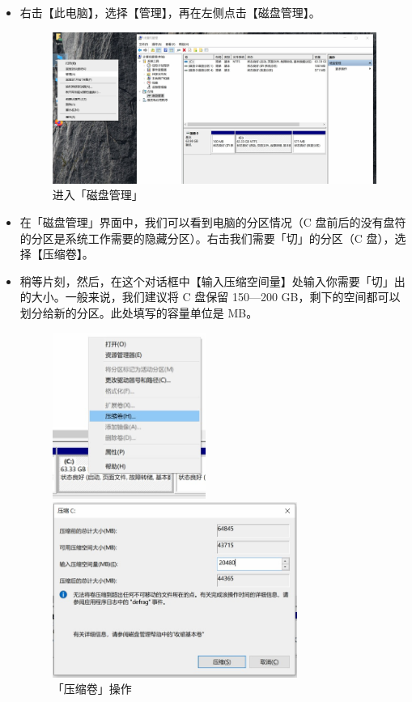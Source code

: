 \begin{itemize}
  \item 右击【此电脑】，选择【管理】，再在左侧点击【磁盘管理】。
    \begin{figure}[htb!]
      \centering
      \includegraphics[width=11cm]{assets/Disk_Manage.jpg}
      \caption{进入「磁盘管理」}
      \label{disk-manage}
    \end{figure}
  \item 在「磁盘管理」界面中，我们可以看到电脑的分区情况（C 盘前后的没有盘符的分区是系统工作需要的隐藏分区）。右击我们需要「切」的分区（C 盘），选择【压缩卷】。
  \item 稍等片刻，然后，在这个对话框中【输入压缩空间量】处输入你需要「切」出的大小。一般来说，我们建议将 C 盘保留 150—200 GB，剩下的空间都可以划分给新的分区。此处填写的容量单位是 MB。
  \begin{figure}[htb!]
    \centering
    \begin{minipage}{5.2cm}
      \centering
      \includegraphics[width=5cm]{assets/Compress_Volume.jpg}
      \caption{「压缩卷」操作}
      \label{comperss-volume}
    \end{minipage}
    \begin{minipage}{8.2cm}
      \centering
      \includegraphics[width=8cm]{assets/Compress_Size.jpg}

\end{minipage}
\end{figure}
\end{itemize}
